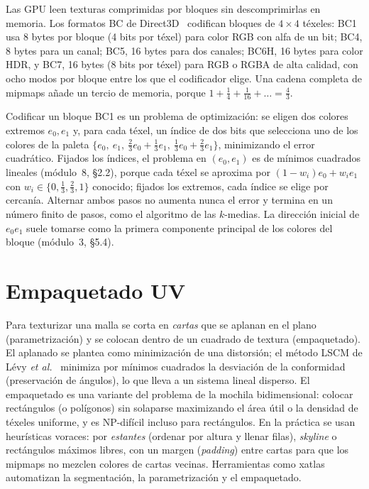 Las GPU leen texturas comprimidas por bloques sin descomprimirlas en memoria. Los formatos BC de Direct3D~\cite{msbc} codifican bloques de $4\times 4$ téxeles: BC1 usa 8 bytes por bloque (4 bits por téxel) para color RGB con alfa de un bit; BC4, 8 bytes para un canal; BC5, 16 bytes para dos canales; BC6H, 16 bytes para color HDR, y BC7, 16 bytes (8 bits por téxel) para RGB o RGBA de alta calidad, con ocho modos por bloque entre los que el codificador elige. Una cadena completa de mipmaps añade un tercio de memoria, porque $1+\tfrac14+\tfrac1{16}+\dots=\tfrac43$.

Codificar un bloque BC1 es un problema de optimización: se eligen dos colores extremos $e_0,e_1$ y, para cada téxel, un índice de dos bits que selecciona uno de los colores de la paleta $\{e_0,\ e_1,\ \tfrac23e_0+\tfrac13e_1,\ \tfrac13e_0+\tfrac23e_1\}$, minimizando el error cuadrático. Fijados los índices, el problema en $(e_0,e_1)$ es de mínimos cuadrados lineales (módulo~8, §2.2), porque cada téxel se aproxima por $(1-w_i)e_0+w_ie_1$ con $w_i\in\{0,\tfrac13,\tfrac23,1\}$ conocido; fijados los extremos, cada índice se elige por cercanía. Alternar ambos pasos no aumenta nunca el error y termina en un número finito de pasos, como el algoritmo de las $k$-medias. La dirección inicial de $e_0e_1$ suele tomarse como la primera componente principal de los colores del bloque (módulo~3, §5.4).

\section{Empaquetado UV}

Para texturizar una malla se corta en \emph{cartas} que se aplanan en el plano (parametrización) y se colocan dentro de un cuadrado de textura (empaquetado). El aplanado se plantea como minimización de una distorsión; el método LSCM de Lévy \emph{et al.}~\cite{lscm} minimiza por mínimos cuadrados la desviación de la conformidad (preservación de ángulos), lo que lleva a un sistema lineal disperso. El empaquetado es una variante del problema de la mochila bidimensional: colocar rectángulos (o polígonos) sin solaparse maximizando el área útil o la densidad de téxeles uniforme, y es NP-difícil incluso para rectángulos. En la práctica se usan heurísticas voraces: por \emph{estantes} (ordenar por altura y llenar filas), \emph{skyline} o rectángulos máximos libres, con un margen (\emph{padding}) entre cartas para que los mipmaps no mezclen colores de cartas vecinas. Herramientas como xatlas automatizan la segmentación, la parametrización y el empaquetado.

